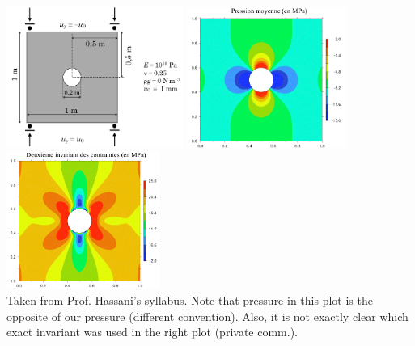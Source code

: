 \begin{center}
\includegraphics[width=5.8cm]{python_codes/fieldstone_124/images/hassani1}
\includegraphics[width=5.2cm]{python_codes/fieldstone_124/images/hassani2}
\includegraphics[width=5cm]{python_codes/fieldstone_124/images/hassani3}\\
{\captionfont Taken from Prof. Hassani's syllabus. Note that pressure in this plot is the opposite 
of our pressure (different convention). Also, it is not exactly clear 
which exact invariant was used in the right plot (private comm.).}
\end{center}

